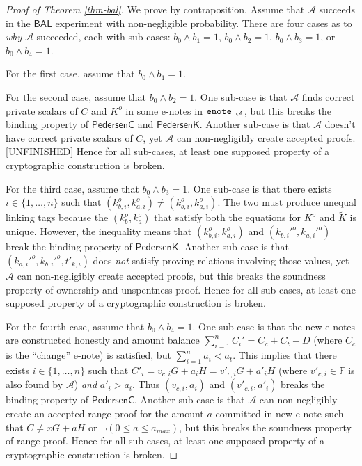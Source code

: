 \documentclass{article}
\theoremstyle{plain}
\theoremstyle{remark}
\begin{document}
\begin{proof}[Proof of Theorem \ref{thm-bal}]
We prove by contraposition. Assume that $\mathcal{A}$ succeeds in the $\textsf{BAL}$ experiment with non-negligible probability. There are four cases as to \textit{why} $\mathcal{A}$ succeeded, each with sub-cases: $b_0 \wedge b_1 = 1$, $b_0 \wedge b_2 = 1$, $b_0 \wedge b_3 = 1$, or $b_0 \wedge b_4 = 1$.

For the first case, assume that $b_0 \wedge b_1 = 1$.

For the second case, assume that $b_0 \wedge b_2 = 1$. One sub-case is that $\mathcal{A}$ finds correct private scalars of $C$ and $K^o$ in some e-notes in ${\tt enote}_{\neg\mathcal{A}}$, but this breaks the binding property of $\textsf{PedersenC}$ and $\textsf{PedersenK}$. Another sub-case is that $\mathcal{A}$ doesn't have correct private scalars of $C$, yet $\mathcal{A}$ can non-negligibly create accepted proofs. [UNFINISHED] Hence for all sub-cases, at least one supposed property of a cryptographic construction is broken.

For the third case, assume that $b_0 \wedge b_3 = 1$. One sub-case is that there exists $i\in\{1,\ldots,n\}$ such that $(k_{b,i}^o, k_{a,i}^o) \ne (k_{b,i}^o, k_{a,i}^o)$. The two must produce unequal linking tags because the $(k_b^o, k_a^o)$ that satisfy both the equations for $K^o$ and $\tilde{K}$ is unique. However, the inequality means that $(k_{b,i}^o, k_{a,i}^o)$ and $( k_{b,i}'^o, k_{a,i}'^o)$ break the binding property of $\textsf{PedersenK}$. Another sub-case is that $( k_{a,i}'^o, k_{b,i}'^o, t'_{k,i})$ does \textit{not} satisfy proving relations involving those values, yet $\mathcal{A}$ can non-negligibly create accepted proofs, but this breaks the soundness property of ownership and unspentness proof. Hence for all sub-cases, at least one supposed property of a cryptographic construction is broken.

For the fourth case, assume that $b_0 \wedge b_4= 1$. One sub-case is that the new e-notes are constructed honestly and amount balance $\sum_{i=1}^n{C_i'} = C_c + C_t - D$ (where $C_c$ is the ``change'' e-note) is satisfied, but $\sum_{i=1}^n{a_i} < a_t$. This implies that there exists $i\in\{1,\ldots,n\}$ such that $C'_i = v_{c,i} G + a_i H = v'_{c,i} G + a'_i H$ (where $v'_{c,i}\in\mathbb{F}$ is also found by $\mathcal{A}$) \textit{and} $a'_i > a_i$. Thus $( v_{c,i}, a_i)$ and $(v'_{c,i}, a'_i)$ breaks the binding property of $\textsf{PedersenC}$. Another sub-case is that $\mathcal{A}$ can non-negligibly create an accepted range proof for the amount $a$ committed in new e-note such that $C \ne x G + a H$ or $\neg (0 \le a \le a_{max})$, but this breaks the soundness property of range proof. Hence for all sub-cases, at least one supposed property of a cryptographic construction is broken.
\end{proof}
\end{document}
